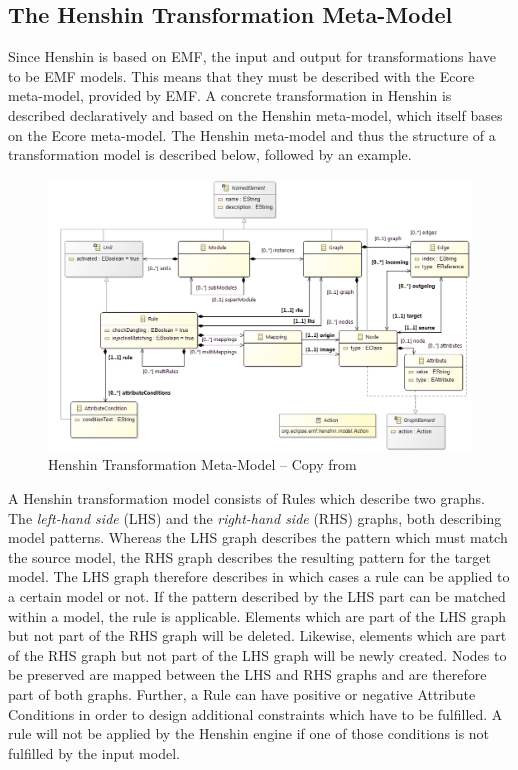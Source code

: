 \documentclass[runningheads]{llncs}
\begin{document}
\subsection{The Henshin Transformation Meta-Model}\label{henshin-meta-model}
Since Henshin is based on EMF, the input and output for transformations have to be EMF models. This means that they must be described with the Ecore meta-model, provided by EMF. A concrete transformation in Henshin is described declaratively and based on the Henshin meta-model, which itself bases on the Ecore meta-model. The Henshin meta-model and thus the structure of a transformation model is described below, followed by an example. 

\begin{figure}[H]
	\centering
	\includegraphics[width=1.0\textwidth]{Henshin_Transformation_Modules}
	\caption{Henshin Transformation Meta-Model -- Copy from \cite{henshin-transformation-meta-model}}
	\label{fig:henshin-transformation-meta-model}
\end{figure} 

\noindent
A Henshin transformation model consists of Rules which describe two graphs. The \textit{left-hand side} (LHS) and the \textit{right-hand side} (RHS) graphs, both describing model patterns. Whereas the LHS graph describes the pattern which must match the source model, the RHS graph describes the resulting pattern for the target model. The LHS graph therefore describes in which cases a rule can be applied to a certain model or not. If the pattern described by the LHS part can be matched within a model, the rule is applicable. Elements which are part of the LHS graph but not part of the RHS graph will be deleted. Likewise, elements which are part of the RHS graph but not part of the LHS graph will be newly created. Nodes to be preserved are mapped between the LHS and RHS graphs and are therefore part of both graphs. Further, a Rule can have positive or negative Attribute Conditions in order to design additional constraints which have to be fulfilled. A rule will not be applied by the Henshin engine if one of those conditions is not fulfilled by the input model. 
\end{document}

